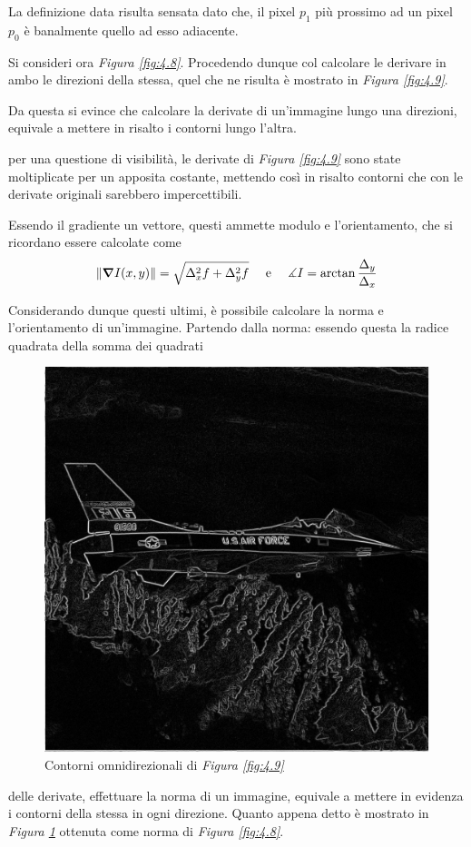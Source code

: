 \documentclass{subfiles}
\begin{document}
La definizione data risulta sensata dato che, il pixel \(p_{1}\) più prossimo ad un pixel \(p_{0}\) è banalmente quello ad esso adiacente.

Si consideri ora \emph{Figura \ref{fig:4.8}}. Procedendo dunque col calcolare le derivare in ambo le direzioni della stessa,
quel che ne risulta è mostrato in \emph{Figura \ref{fig:4.9}}.

Da questa si evince che calcolare la derivate di un'immagine lungo una direzioni, equivale a mettere in risalto i contorni lungo l'altra.

\begin{Remark*}
    per una questione di visibilità, le derivate di \emph{Figura \ref{fig:4.9}} sono state moltiplicate per un apposita costante,
    mettendo così in risalto contorni che con le derivate originali sarebbero impercettibili.
\end{Remark*}

Essendo il gradiente un vettore, questi ammette modulo e l'orientamento, che si ricordano essere calcolate come
\[
    \norm{\grad{I(x,y)}} = \sqrt{\Delta_{x}^{2}f + \Delta_{y}^{2}f} \quad \text{e} \quad \measuredangle I = \arctan \frac{\Delta_{y}}{\Delta_{x}}
\]

Considerando dunque questi ultimi, è possibile calcolare la norma e l'orientamento di un'immagine.
Partendo dalla norma: essendo questa la radice quadrata della somma dei quadrati
\begin{figure}
    \centering
    \includegraphics[scale = 0.325]{../Images/Airplane/NormAirplane.png}
    \caption{Contorni  omnidirezionali di \emph{Figura \ref{fig:4.9}}}
    \label{fig:4.10}
\end{figure}
delle derivate, effettuare la norma di un immagine, equivale a mettere in evidenza i contorni della stessa in ogni direzione.
Quanto appena detto è mostrato in \emph{Figura \ref{fig:4.10}} ottenuta come norma di \emph{Figura \ref{fig:4.8}}.
\end{document}
